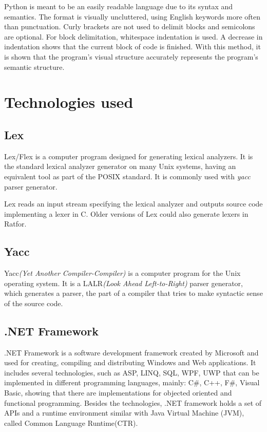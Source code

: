 \documentclass[12pt,a4paper,twoside]{report}
\begin{document}
Python is meant to be an easily readable language due to its syntax and semantics. The format is visually uncluttered, using English keywords more often than punctuation. Curly brackets are not used to delimit blocks and semicolons are optional. For block delimitation, whitespace indentation is used. A decrease in indentation shows that the current block of code is finished. With this method, it is shown that the program's visual structure accurately represents the program's semantic structure. 

\section{Technologies used}

\subsection{Lex}

Lex/Flex is a computer program designed for generating lexical analyzers. It is the standard lexical analyzer generator on many Unix systems, having an equivalent tool as part of the POSIX standard. It is commonly used with \textit{yacc} parser generator.

Lex reads an input stream specifying the lexical analyzer and outputs source code implementing a lexer in C. Older versions of Lex could also generate lexers in Ratfor. 

\subsection{Yacc}

Yacc\textit{(Yet Another Compiler-Compiler)} is a computer program for the Unix operating system. It is a LALR\textit{(Look Ahead Left-to-Right)} parser generator, which generates a parser, the part of a compiler that tries to make syntactic sense of the source code. 

\subsection{.NET Framework}

.NET Framework is a software development framework created by Microsoft and used for creating, compiling and distributing Windows and Web applications. It includes several technologies, such as ASP, LINQ, SQL, WPF, UWP that can be implemented in different programming languages, mainly: C\#, C++, F\#, Visual Basic, showing that there are implementations for objected oriented and functional programming. Besides the technologies, .NET framework holds a set of APIs and a runtime environment similar with Java Virtual Machine (JVM), called Common Language Runtime(CTR). 
\end{document}
